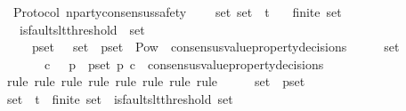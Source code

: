 \begin{isabellebody}
%
\endisadelimproof
\isanewline
\isanewline
{}\isamarkupfalse%
\ {\isacharparenleft}\ Protocol{\isacharparenright}\ n{\isacharunderscore}party{\isacharunderscore}consensus{\isacharunderscore}safety\ {\isacharcolon}\isanewline
\ \ {\isachardoublequoteopen}{\isasymforall}\ {\isasymsigma}{\isacharunderscore}set{\isachardot}\ {\isasymsigma}{\isacharunderscore}set\ {\isasymsubseteq}\ {\isasymSigma}t\isanewline
\ \ {\isasymlongrightarrow}\ finite\ {\isasymsigma}{\isacharunderscore}set\isanewline
\ \ {\isasymlongrightarrow}\ is{\isacharunderscore}faults{\isacharunderscore}lt{\isacharunderscore}threshold\ {\isacharparenleft}{\isasymUnion}\ {\isasymsigma}{\isacharunderscore}set{\isacharparenright}\isanewline
\ \ {\isasymlongrightarrow}\ {\isacharparenleft}{\isasymforall}\ {\isasymsigma}\ p{\isacharunderscore}set{\isachardot}\ {\isasymsigma}\ {\isasymin}\ {\isasymsigma}{\isacharunderscore}set\ {\isasymand}\ p{\isacharunderscore}set\ {\isasymin}\ Pow\ {\isacharparenleft}{\isasymUnion}\ {\isacharbraceleft}consensus{\isacharunderscore}value{\isacharunderscore}property{\isacharunderscore}decisions\ {\isasymsigma}{\isacharprime}\ {\isacharbar}\ {\isasymsigma}{\isacharprime}{\isachardot}\ {\isasymsigma}{\isacharprime}\ {\isasymin}\ {\isasymsigma}{\isacharunderscore}set{\isacharbraceright}{\isacharparenright}\ {\isacharminus}\ {\isasymemptyset}\ \isanewline
\ \ \ \ \ \ {\isasymlongrightarrow}\ {\isacharparenleft}{\isasymlambda}c{\isachardot}\ {\isasymnot}\ {\isacharparenleft}{\isasymforall}\ p\ {\isasymin}\ p{\isacharunderscore}set{\isachardot}\ p\ c{\isacharparenright}{\isacharparenright}\ {\isasymnotin}\ consensus{\isacharunderscore}value{\isacharunderscore}property{\isacharunderscore}decisions\ {\isasymsigma}{\isacharparenright}{\isachardoublequoteclose}\isanewline
%
\isadelimproof
\ \ %
\endisadelimproof
%
\isatagproof
{}\isamarkupfalse%
\ {\isacharparenleft}rule{\isacharcomma}\ rule{\isacharcomma}\ rule{\isacharcomma}\ rule{\isacharcomma}\ rule{\isacharcomma}\ rule{\isacharcomma}\ rule{\isacharcomma}\ rule{\isacharparenright}\isanewline
{}\isamarkupfalse%
\ {\isacharminus}\isanewline
\ \ \isamarkupfalse%
\ {\isasymsigma}{\isacharunderscore}set\ {\isasymsigma}\ p{\isacharunderscore}set\isanewline
\ \ \isamarkupfalse%
\ {\isachardoublequoteopen}{\isasymsigma}{\isacharunderscore}set\ {\isasymsubseteq}\ {\isasymSigma}t{\isachardoublequoteclose}\ \ {\isachardoublequoteopen}finite\ {\isasymsigma}{\isacharunderscore}set{\isachardoublequoteclose}\ \ {\isachardoublequoteopen}is{\isacharunderscore}faults{\isacharunderscore}lt{\isacharunderscore}threshold\ {\isacharparenleft}{\isasymUnion}{\isasymsigma}{\isacharunderscore}set{\isacharparenright}{\isachardoublequoteclose}\ \isanewline

\end{isabellebody}
